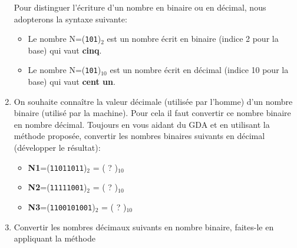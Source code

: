 \documentclass{article}
\begin{document}
\begin{enumerate}
\begin{minipage}[b]{.08\linewidth}
	\vspace{1em}
\end{minipage}
\hfill
\begin{minipage}[b]{.85\linewidth}
Pour distinguer l'écriture d'un nombre en binaire ou en décimal, nous adopterons la syntaxe suivante:
\begin{itemize}
	\item Le nombre N=(\texttt{101})$_{2}$ est un nombre écrit en binaire (indice 2 pour la base) qui vaut \textbf{cinq}.
	\item Le nombre N=(\texttt{101})$_{10}$ est un nombre écrit en décimal (indice 10 pour la base) qui vaut \textbf{cent un}.
\end{itemize}
\end{minipage}
	\item On souhaite connaître la valeur décimale (utilisée par l'homme) d'un nombre binaire (utilisé par la machine).
		Pour cela il faut convertir ce nombre binaire en nombre décimal.
		Toujours en vous aidant du GDA et en utilisant la méthode proposée, convertir les nombres binaires suivants en décimal (développer le résultat):\\
		\begin{itemize}
			\item \textbf{N1}=(\texttt{11011011})$_{2}$ = ( ? )$_{10}$\\
\vspace{1em}
\begin{Form}
	\TextField[name=r101,width=\linewidth,height=2.5em,multiline=true,default=N1=]{}
\end{Form}
			\item \textbf{N2}=(\texttt{11111001})$_{2}$ = ( ? )$_{10}$\\
\vspace{1em}
\begin{Form}
	\TextField[name=r102,width=\linewidth,height=2.5em,multiline=true,default=N2=]{}
\end{Form}
			\item \textbf{N3}=(\texttt{1100101001})$_{2}$ = ( ? )$_{10}$\\
\vspace{1em}
\begin{Form}
	\TextField[name=r103,width=\linewidth,height=2.5em,multiline=true,default=N3=]{}
\end{Form}
		\end{itemize}
	\item Convertir les nombres décimaux suivants en nombre binaire, faites-le en appliquant la méthode

\end{enumerate}
\end{document}
